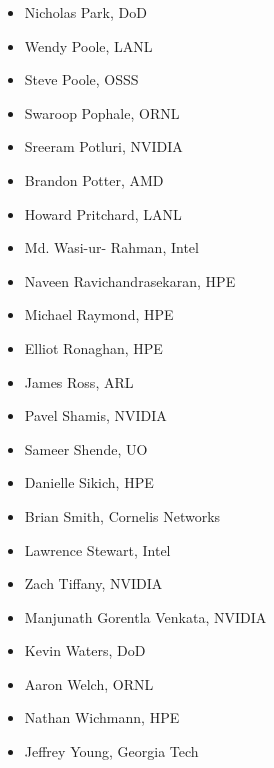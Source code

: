 \begin{multicols}{2}
\begin{itemize}
\item Nicholas Park, \ac{DoD}
\item Wendy Poole, \ac{LANL}
\item Steve Poole\footnotemark[6], \ac{OSSS}
\item Swaroop Pophale, \ac{ORNL}
\item Sreeram Potluri, NVIDIA
\item Brandon Potter\footnotemark[4], \ac{AMD}
\item Howard Pritchard, \ac{LANL}
\item Md. Wasi-ur- Rahman\footnotemark[11], Intel
\item Naveen Ravichandrasekaran\footnotemark[9], \ac{HPE}
\item Michael Raymond, \ac{HPE}
\item Elliot Ronaghan\footnotemark[8], \ac{HPE}
\item James Ross, \ac{ARL}
\item Pavel Shamis, NVIDIA
\item Sameer Shende, \ac{UO}
\item Danielle Sikich, \ac{HPE}
\item Brian Smith, Cornelis Networks
\item Lawrence Stewart\footnotemark[7], Intel
\item Zach Tiffany, NVIDIA
\item Manjunath Gorentla Venkata\footnotemark[10], NVIDIA
\item Kevin Waters\footnotemark[3], \ac{DoD}
\item Aaron Welch, \ac{ORNL}
\item Nathan Wichmann, \ac{HPE}
\item Jeffrey Young, Georgia Tech
\end{itemize}
\end{multicols}

